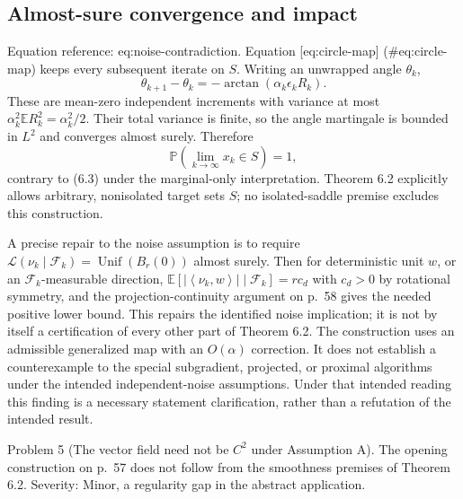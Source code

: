 \documentclass[10pt]{article}
\begin{document}
\subsection*{Almost-sure convergence and impact}
Equation reference: eq:noise-contradiction. Equation [eq:circle-map] (\#eq:circle-map) keeps every subsequent iterate on \(S\). Writing an unwrapped angle \(\theta_k\), \[\theta_{k+1}-\theta_k=-\arctan(\alpha_k\epsilon_kR_k).\] These are mean-zero independent increments with variance at most \(\alpha_k^2\mathbb ER_k^2=\alpha_k^2/2\). Their total variance is finite, so the angle martingale is bounded in \(L^2\) and converges almost surely. Therefore \[
 \mathbb P(\lim_{k\to\infty}x_k\in S)=1,\] contrary to (6.3) under the marginal-only interpretation. Theorem 6.2 explicitly allows arbitrary, nonisolated target sets \(S\); no isolated-saddle premise excludes this construction.\par
A precise repair to the noise assumption is to require \(\mathcal L(\nu_k\mid\mathcal F_k)=\mathop{\mathrm{Unif}}(B_r(0))\) almost surely. Then for deterministic unit \(w\), or an \(\mathcal F_k\)-measurable direction, \(\mathbb E[|\left\langle \nu_k,w\right\rangle|\mid\mathcal F_k]=rc_d\) with \(c_d>0\) by rotational symmetry, and the projection-continuity argument on p. 58 gives the needed positive lower bound. This repairs the identified noise implication; it is not by itself a certification of every other part of Theorem 6.2. The construction uses an admissible generalized map with an \(O(\alpha)\) correction. It does not establish a counterexample to the special subgradient, projected, or proximal algorithms under the intended independent-noise assumptions. Under that intended reading this finding is a necessary statement clarification, rather than a refutation of the intended result.\par
Problem 5 (The vector field need not be \(C^2\) under Assumption A).  The opening construction on p. 57 does not follow from the smoothness premises of Theorem 6.2. Severity: Minor, a regularity gap in the abstract application.\par
\end{document}
